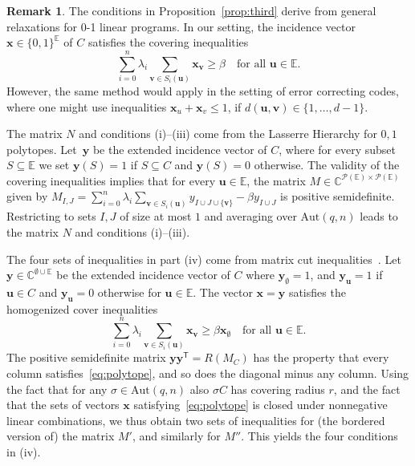 \documentclass[10pt,a4paper]{article}
\newcommand{\E}{\mathbb{E}}
\newcommand{\C}{\mathbb{C}}
\theoremstyle{definition}
\newtheorem{remark}{Remark}[section]
\newcommand{\xx}{\mathbf{x}}
\newcommand{\yy}{\mathbf{y}}
\newcommand{\uu}{\mathbf{u}}
\newcommand{\vv}{\mathbf{v}}
\newcommand{\Aut}{\mathrm{Aut}}
\newcommand{\T}{^{\mathsf{T}}}
\begin{document}
\begin{remark}
The conditions in Proposition~\ref{prop:third} derive from general relaxations for 0-1 linear programs. In our setting, the incidence vector $\xx\in \{0,1\}^\E$ of $C$ satisfies the covering inequalities 
\[
\sum_{i=0}^n \lambda_i \sum_{\vv\in S_i(\uu)}\xx_\vv\geq \beta\quad \text{for all $\uu\in \E$.}
\]
However, the same method would apply in the setting of error correcting codes, where one might use inequalities $\xx_u+\xx_v\leq 1$, if $d(\uu,\vv)\in \{1,\ldots, d-1\}$. 

The matrix $N$ and conditions (i)--(iii) come from the Lasserre Hierarchy for $0,1$ polytopes. Let~$\yy$ be the extended incidence vector of $C$, where for every subset $S\subseteq \E$ we set $\yy(S)=1$ if $S\subseteq C$ and $\yy(S)=0$ otherwise. The validity of the covering inequalities implies that for every $\uu\in\E$, the matrix $M\in \C^{\mathcal{P}(\E)\times \mathcal{P}(\E)}$ given by $M_{I,J}=\sum_{i=0}^n \lambda_i\sum_{\vv\in S_i(\uu)} y_{I\cup J\cup\{\vv\}}-\beta y_{I\cup J}$ is positive semidefinite. Restricting to sets $I,J$ of size at most $1$ and averaging over $\Aut(q,n)$ leads to the matrix $N$ and conditions (i)--(iii).

The four sets of inequalities in part (iv) come from matrix cut inequalities~\cite{LS}. Let $\yy\in \C^{\emptyset\cup \E}$ be the extended incidence vector of $C$ where $\yy_\emptyset=1$, and $\yy_\uu=1$ if $\uu\in C$ and $\yy_\uu=0$ otherwise for $\uu\in\E$. The vector $\xx=\yy$ satisfies the homogenized cover inequalities
\begin{equation}\label{eq:polytope}
\sum_{i=0}^n \lambda_i\sum_{\vv\in S_i(\uu)} \xx_\vv\geq \beta\xx_{\emptyset} \quad\text{for all $\uu\in\E$}.
\end{equation}
The positive semidefinite matrix $\yy\yy\T=R(M_C)$ has the property that every column satisfies~\eqref{eq:polytope}, and so does the diagonal minus any column. Using the fact that for any $\sigma\in \Aut(q,n)$ also $\sigma C$ has covering radius $r$, and the fact that the sets of vectors $\xx$ satisfying~\eqref{eq:polytope} is closed under nonnegative linear combinations,  we thus obtain two sets of inequalities for (the bordered version of) the matrix $M'$, and similarly for $M''$. This yields the four conditions in (iv).  
\end{remark}
\end{document}
